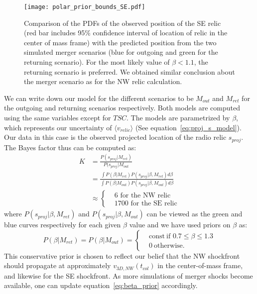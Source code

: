 \begin{figure}
	\texttt{[image: polar\_prior\_bounds\_SE.pdf]}
	\caption{Comparison of the PDFs of the observed position of the SE relic (red bar
		includes 95\% confidence interval of location of relic in the center of
		mass frame) with the	predicted position from the two simulated merger scenarios (blue for
	outgoing and green for the returning scenario). 
	For the most likely value of $\beta < 1.1$, the returning scenario is preferred. 
	We obtained similar conclusion about the merger scenario as for the NW
	relic calculation.
	\label{fig:positionprior_SE}}
\end{figure}
We can write down our model for the different scenarios to be $M_{out}$ and
$M_{ret}$ for the outgoing and returning scenarios respectively. Both
models are computed using the same variables except for $TSC$. The models
are parametrized by $\beta$, which represents our uncertainty of $\langle v_{relic} \rangle$
(See equation~\ref{eq:proj_s_model}). Our data in this
case is the observed projected location of the radio relic $s_{proj}$. 
The Bayes factor thus can be computed as: 
\begin{align}
	K &= \frac{P(s_{proj} | M_{ret})}{P(s_{proj}| M_{out}}\\
	 &= \frac
	 {\int P(\beta | M_{ret}) P(s_{proj} | \beta, M_{ret}) d\beta}
	 {\int P(\beta | M_{out}) P(s_{proj} | \beta, M_{out})
 d\beta}\\
 &\approx 
 \begin{cases}
 & 6 \text{ for the NW relic}\\
 & 1700 \text{ for the SE relic}
 \end{cases}
\end{align}
where $P(s_{proj} | \beta, M_{ret})$ and $P(s_{proj} | \beta, M_{out})$ can be
viewed as the green and blue curves respectively for each given $\beta$ value and we
have used priors on $\beta$ as: 
\begin{equation}
	\label{eq:beta_prior}
	P(\beta | M_{ret}) = P(\beta | M_{out}) =  
	\begin{cases}
		& \text{const}~\text{if } 0.7 \leq \beta \leq 1.3 \\
		& 0~\text{otherwise}.
	\end{cases}
\end{equation}
This conservative prior is chosen to reflect our belief that the
NW shockfront should propagate at approximately $v_{3D, NW}(t_{col})$ in the
center-of-mass frame, and likewise for the SE shockfront.  As more
simulations of merger shocks become available, one can update equation~\ref{eq:beta_prior} accordingly.


\bsp 
\label{lastpage} 

